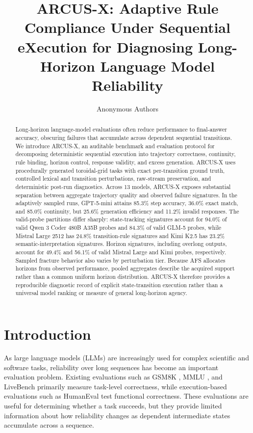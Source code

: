 \documentclass{article}
\title{ARCUS-X: Adaptive Rule Compliance Under Sequential eXecution for Diagnosing Long-Horizon Language Model Reliability}
\author{Anonymous Authors}
\begin{document}
\maketitle

\begin{abstract}
Long-horizon language-model evaluations often reduce performance to final-answer accuracy, obscuring failures that accumulate across dependent sequential transitions. We introduce ARCUS-X, an auditable benchmark and evaluation protocol for decomposing deterministic sequential execution into trajectory correctness, continuity, rule binding, horizon control, response validity, and excess generation. ARCUS-X uses procedurally generated toroidal-grid tasks with exact per-transition ground truth, controlled lexical and transition perturbations, raw-stream preservation, and deterministic post-run diagnostics. Across 13 models, ARCUS-X exposes substantial separation between aggregate trajectory quality and observed failure signatures. In the adaptively sampled runs, GPT-5-mini attains 85.3\% step accuracy, 36.0\% exact match, and 85.0\% continuity, but 25.6\% generation efficiency and 11.2\% invalid responses. The valid-probe partitions differ sharply: state-tracking signatures account for 94.0\% of valid Qwen 3 Coder 480B A35B probes and 84.3\% of valid GLM-5 probes, while Mistral Large 2512 has 24.8\% transition-rule signatures and Kimi K2.5 has 23.2\% semantic-interpretation signatures. Horizon signatures, including overlong outputs, account for 49.4\% and 56.1\% of valid Mistral Large and Kimi probes, respectively. Sampled fracture behavior also varies by perturbation tier. Because AFS allocates horizons from observed performance, pooled aggregates describe the acquired support rather than a common uniform horizon distribution. ARCUS-X therefore provides a reproducible diagnostic record of explicit state-transition execution rather than a universal model ranking or measure of general long-horizon agency.

\end{abstract}

\section{Introduction}

As large language models (LLMs) are increasingly used for complex scientific and software tasks, reliability over long sequences has become an important evaluation problem. Existing evaluations such as GSM8K \cite{cobbe2021gsm8k}, MMLU \cite{hendrycks2020mmlu}, and LiveBench \cite{gu2024livebench} primarily measure task-level correctness, while execution-based evaluations such as HumanEval \cite{chen2021evaluating} test functional correctness. These evaluations are useful for determining whether a task succeeds, but they provide limited information about how reliability changes as dependent intermediate states accumulate across a sequence.
\end{document}
